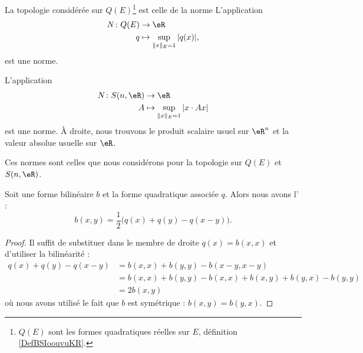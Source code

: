 \begin{lemma}       \label{LEMooWRCIooWkMpoF}
	La topologie considérée sur \( Q(E)\)\footnote{\( Q(E)\) sont les formes quadratiques réelles sur \( E\), définition \ref{DefBSIoouvuKR}.} est celle de la norme
	L'application
	\begin{equation}  \label{EqZYBooZysmVh}
		\begin{aligned}
			N\colon Q(E) & \to \eR                            \\
			q            & \mapsto\sup_{\| x \|_E=1}| q(x) |,
		\end{aligned}
	\end{equation}
	est une norme.

	L'application
	\begin{equation}  \label{EQooJETQooIjxRWu}
		\begin{aligned}
			N\colon S(n,\eR) & \to \eR                                  \\
			A                & \mapsto  \sup_{\| x \|_E=1}| x\cdot Ax |
		\end{aligned}
	\end{equation}
	est une norme.  À droite, nous trouvons le produit scalaire usuel sur \( \eR^n\) et la valeur absolue usuelle sur \( \eR\).

	Ces normes sont celles que nous considérons pour la topologie sur \( Q(E)\) et \( S(n,\eR)\).
\end{lemma}

\begin{proposition} \label{PROPooZLXVooOsXCcB}
	Soit une forme bilinéaire \( b\) et la forme quadratique associée \( q\). Alors nous avons l' :
	\begin{equation}    \label{EqMrbsop}
		b(x,y)=\frac{ 1 }{2}\big( q(x)+q(y)-q(x-y) \big).
	\end{equation}
\end{proposition}

\begin{proof}
	Il suffit de substituer dans le membre de droite \( q(x)=b(x,x)\) et d'utiliser la bilinéarité :
	\begin{subequations}
		\begin{align}
			q(x)+q(y)-q(x-y) & =b(x,x)+b(y,y)-b(x-y,x-y)                  \\
			                 & =b(x,x)+b(y,y)-b(x,x)+b(x,y)+b(y,x)-b(y,y) \\
			                 & =2b(x,y)
		\end{align}
	\end{subequations}
	où nous avons utilisé le fait que \( b\) est symétrique : \( b(x,y)=b(y,x)\).
\end{proof}

